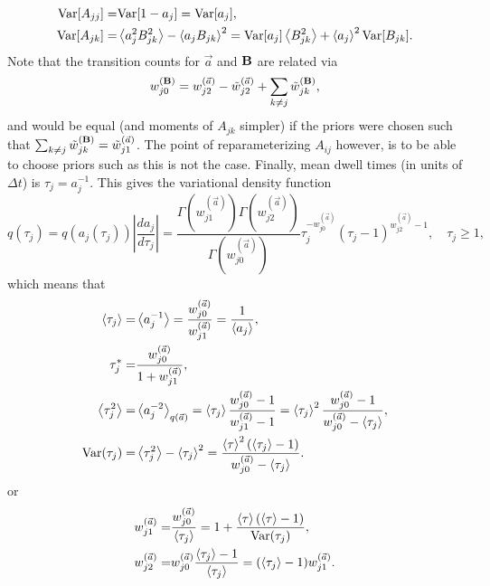 \begin{align}
\text{Var}[A_{jj}]=&\text{Var}[1-a_j]=\text{Var}[a_j],\\
\text{Var}[A_{jk}]=&\left\langle a_j^2B_{jk}^2\right\rangle-\left\langle a_jB_{jk}\right\rangle^2
        =\text{Var}[a_j]\left\langle B_{jk}^2\right\rangle+\left\langle a_j\right\rangle^2\text{Var}[B_{jk}].
\end{align}
Note that the transition counts
for $\vec a$ and $\mathbf{B}$ are related via
\begin{equation}
w_{j0}^{(\mathbf{B})}=w_{j2}^{(\vec{a})}-\tilde w_{j2}^{(\vec{a})}+\sum_{k\ne j}\tilde w_{jk}^{(\mathbf{B})},
\end{equation}
and would be equal (and moments of $A_{jk}$ simpler) if the priors
were chosen such that $\sum_{k\ne j}\tilde
w_{jk}^{(\mathbf{B})}=\tilde w_{j1}^{(\vec{a})}$. The point of
reparameterizing $A_{ij}$ however, is to be able to choose priors such
as this is not the case. Finally, mean dwell times (in units of
$\Delta t$) is $\tau_j=a_j^{-1}$. This gives the variational density
function
\begin{equation}
q(\tau_j)=q(a_j(\tau_j))\left|\frac{da_j}{d\tau_j}\right|
=\frac{\Gamma(w_{j1}^{(\vec{a})})\Gamma(w_{j2}^{(\vec{a})})}{\Gamma(w_{j0}^{(\vec{a})})}
\tau_j^{-w_{j0}^{(\vec{a})}}(\tau_j-1)^{w_{j2}^{(\vec{a})}-1},
\quad \tau_j\ge 1,
\end{equation}
which means that
\begin{align}
\left\langle \tau_j\right\rangle=&\left\langle a_j^{-1}\right\rangle=
\frac{w_{j0}^{(\vec{a})}}{w_{j1}^{(\vec{a})}}=\frac{1}{\left\langle a_j\right\rangle},\\
\tau_j^*=&\frac{w_{j0}^{(\vec{a})}}{1+w_{j1}^{(\vec{a})}},\\
\left\langle \tau_j^2\right\rangle=&\left\langle a_j^{-2}\right\rangle_{q(\vec{a})}=
\left\langle \tau_j\right\rangle\frac{w_{j0}^{(\vec{a})}-1}{w_{j1}^{(\vec{a})}-1}
=\left\langle \tau_j\right\rangle^2\frac{w_{j0}^{(\vec{a})}-1}{w_{j0}^{(\vec{a})}-\left\langle \tau_j\right\rangle},\\
\text{Var}(\tau_j)=&
\left\langle \tau_j^2\right\rangle-\left\langle \tau_j\right\rangle^2=
\frac{\left\langle \tau\right\rangle^2(\left\langle \tau_j\right\rangle-1)}{w_{j0}^{(\vec{a})}-\left\langle \tau_j\right\rangle}.
\end{align}
or
\begin{align}
w_{j1}^{(\vec{a})}=&\frac{w_{j0}^{(\vec{a})}}{\left\langle \tau_j\right\rangle}
=1+\frac{\left\langle \tau\right\rangle(\left\langle \tau\right\rangle-1)}{\text{Var}(\tau_j)},\nonumber\\
w_{j2}^{(\vec{a})}=&w_{j0}^{(\vec{a})}\frac{\left\langle \tau_j\right\rangle-1}{\left\langle \tau_j\right\rangle}
=(\left\langle \tau_j\right\rangle-1)w_{j1}^{(\vec{a})}.\label{eq:wjka}
\end{align}




